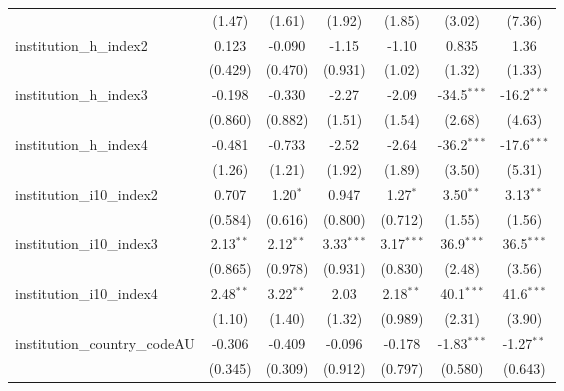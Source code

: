 \begin{tabular}{lcccccc}
                                         & (1.47)        & (1.61)        & (1.92)        & (1.85)        & (3.02)        & (7.36)\\   
   institution\_h\_index2                & 0.123         & -0.090        & -1.15         & -1.10         & 0.835         & 1.36\\   
                                         & (0.429)       & (0.470)       & (0.931)       & (1.02)        & (1.32)        & (1.33)\\   
   institution\_h\_index3                & -0.198        & -0.330        & -2.27         & -2.09         & -34.5$^{***}$ & -16.2$^{***}$\\   
                                         & (0.860)       & (0.882)       & (1.51)        & (1.54)        & (2.68)        & (4.63)\\   
   institution\_h\_index4                & -0.481        & -0.733        & -2.52         & -2.64         & -36.2$^{***}$ & -17.6$^{***}$\\   
                                         & (1.26)        & (1.21)        & (1.92)        & (1.89)        & (3.50)        & (5.31)\\   
   institution\_i10\_index2              & 0.707         & 1.20$^{*}$    & 0.947         & 1.27$^{*}$    & 3.50$^{**}$   & 3.13$^{**}$\\   
                                         & (0.584)       & (0.616)       & (0.800)       & (0.712)       & (1.55)        & (1.56)\\   
   institution\_i10\_index3              & 2.13$^{**}$   & 2.12$^{**}$   & 3.33$^{***}$  & 3.17$^{***}$  & 36.9$^{***}$  & 36.5$^{***}$\\   
                                         & (0.865)       & (0.978)       & (0.931)       & (0.830)       & (2.48)        & (3.56)\\   
   institution\_i10\_index4              & 2.48$^{**}$   & 3.22$^{**}$   & 2.03          & 2.18$^{**}$   & 40.1$^{***}$  & 41.6$^{***}$\\   
                                         & (1.10)        & (1.40)        & (1.32)        & (0.989)       & (2.31)        & (3.90)\\   
   institution\_country\_codeAU          & -0.306        & -0.409        & -0.096        & -0.178        & -1.83$^{***}$ & -1.27$^{**}$\\   
                                         & (0.345)       & (0.309)       & (0.912)       & (0.797)       & (0.580)       & (0.643)\\   

\end{tabular}
